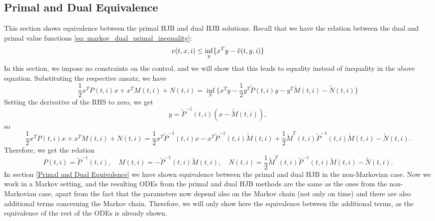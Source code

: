 \newpage
\subsection{Primal and Dual Equivalence}
This section shows equivalence between the primal HJB and dual HJB solutions. Recall that we have the relation between the dual and primal value functions \eqref{eq: markov_dual_primal_inequality}:
\begin{equation*}
    v(t,x,i) \le \inf_y \{x^T y - \Tilde{v}(t,y,i)  \}
\end{equation*}
In this section, we impose no constraints on the control, and we will show that this leads to equality instead of inequality in the above equation. Substituting the respective ansatz, we have
\begin{equation*}
    \frac12 x^T P(t,i) x + x^T M(t,i) + N(t,i) = \inf_y \bigg\{ x^T y - \frac12 y^T \tilde{P}(t,i) y - y^T \tilde{M}(t,i) - \tilde{N}(t,i)  \bigg\}
\end{equation*}
Setting the derivative of the RHS to zero, we get 
\begin{equation*}
    y = \tilde{P}^{-1}(t,i)(x - \tilde{M}(t,i)),
\end{equation*}
so
\begin{equation*}
    \frac12 x^T P(t,i) x + x^T M(t,i) + N(t,i) = \frac12 x^T \tilde{P}^{-1}(t,i)x - x^T \tilde{P}^{-1}(t,i)\tilde{M}(t,i) + \frac12 \tilde{M}^T(t,i) \tilde{P}^{-1}(t,i) \tilde{M}(t,i) - \tilde{N}(t,i).
\end{equation*}
Therefore, we get the relation
\begin{equation}
    P(t,i) = \tilde{P}^{-1}(t,i), \quad M(t,i) = -\tilde{P}^{-1}(t,i) \tilde{M}(t,i), \quad N(t,i) =  \frac12 \tilde{M}^T(t,i) \tilde{P}^{-1}(t,i) \tilde{M}(t,i) - \tilde{N}(t,i). \label{eq: markov_relation}
\end{equation}
In section \ref{Primal and Dual Equivalence} we have shown equivalence between the primal and dual HJB in the non-Markovian case. Now we work in a Markov setting, and the resulting ODEs from the primal and dual HJB methods are the same as the ones from the non-Markovian case, apart from the fact that the parameters now depend also on the Markov chain (not only on time) and there are also additional terms concerning the Markov chain. Therefore, we will only show here the equivalence between the additional terms, as the equivalence of the rest of the ODEs is already shown.\\

